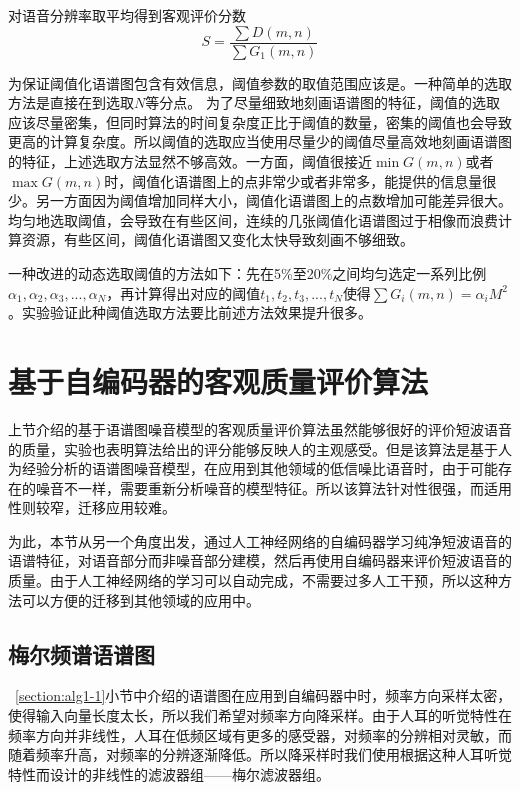 对语音分辨率取平均得到客观评价分数
\begin{equation}\label{eq:score}
S = \frac{\sum D(m,n)}{\sum G_1(m,n)}
\end{equation}

为保证阈值化语谱图包含有效信息，阈值参数的取值范围应该是。一种简单的选取方法是直接在到选取$N$等分点。
为了尽量细致地刻画语谱图的特征，阈值的选取应该尽量密集，但同时算法的时间复杂度正比于阈值的数量，密集的阈值也会导致更高的计算复杂度。所以阈值的选取应当使用尽量少的阈值尽量高效地刻画语谱图的特征，上述选取方法显然不够高效。一方面，阈值很接近$\min{G(m,n)}$或者$\max{G(m,n)}$时，阈值化语谱图上的点非常少或者非常多，能提供的信息量很少。另一方面因为阈值增加同样大小，阈值化语谱图上的点数增加可能差异很大。均匀地选取阈值，会导致在有些区间，连续的几张阈值化语谱图过于相像而浪费计算资源，有些区间，阈值化语谱图又变化太快导致刻画不够细致。

一种改进的动态选取阈值的方法如下：先在5\%至20\%之间均匀选定一系列比例$\alpha_1,\alpha_2,\alpha_3,...,\alpha_N$，再计算得出对应的阈值$t_1,t_2,t_3,...,t_N$使得$\sum G_i(m,n)=\alpha_i M^2$。实验验证此种阈值选取方法要比前述方法效果提升很多。


\section{基于自编码器的客观质量评价算法}

上节介绍的基于语谱图噪音模型的客观质量评价算法虽然能够很好的评价短波语音的质量，实验也表明算法给出的评分能够反映人的主观感受。但是该算法是基于人为经验分析的语谱图噪音模型，在应用到其他领域的低信噪比语音时，由于可能存在的噪音不一样，需要重新分析噪音的模型特征。所以该算法针对性很强，而适用性则较窄，迁移应用较难。

为此，本节从另一个角度出发，通过人工神经网络的自编码器学习纯净短波语音的语谱特征，对语音部分而非噪音部分建模，然后再使用自编码器来评价短波语音的质量。由于人工神经网络的学习可以自动完成，不需要过多人工干预，所以这种方法可以方便的迁移到其他领域的应用中。

\subsection{梅尔频谱语谱图}

~\ref{section:alg1-1}小节中介绍的语谱图在应用到自编码器中时，频率方向采样太密，使得输入向量长度太长，所以我们希望对频率方向降采样。由于人耳的听觉特性在频率方向并非线性，人耳在低频区域有更多的感受器，对频率的分辨相对灵敏，而随着频率升高，对频率的分辨逐渐降低。所以降采样时我们使用根据这种人耳听觉特性而设计的非线性的滤波器组——梅尔滤波器组。

